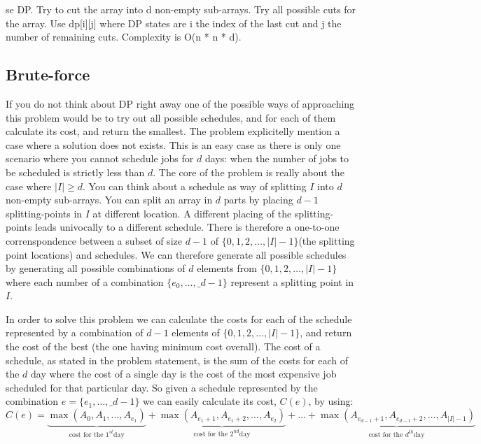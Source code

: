 se DP. Try to cut the array into d non-empty sub-arrays. Try all possible cuts for the array.
Use dp[i][j] where DP states are i the index of the last cut and j the number of remaining cuts. Complexity is O(n * n * d).

\subsection{Brute-force}
\label{min_difficulty_job_scheduler:sec:bruteforce}
If you do not think about DP right away one of the possible ways of approaching this problem would be to try out all possible schedules, and for each of them calculate its cost, 
and return the smallest. 
The problem explicitelly mention a case where a solution does not exists. This is an easy case as there is only one scenario
where you cannot schedule jobs for $d$ days: when the number of jobs to be scheduled is strictly less than $d$.
The core of the problem is really about the case where $|I| \geq d$. 
You can think about a schedule as way of splitting $I$ into $d$ non-empty sub-arrays.
You can split an array in $d$ parts by placing $d-1$ splitting-points in $I$ at different location.
A different placing of the splitting-points leads univocally to a different schedule. 
There is therefore a one-to-one correnspondence between a subset of size $d-1$ of $\{0,1,2, \ldots, |I|-1\}$(the splitting point locations) and schedules. 
We can therefore generate all possible schedules by generating all possible combinations of $d$ elements from $\{0,1,2, \ldots, |I|-1\}$
where each number of a combination  $\{e_0, \ldots, \_{d-1}\}$ represent a splitting point in $I$.

In order to solve this problem we can calculate the costs for each of the schedule represented by a combination of $d-1$ elements of $\{0,1,2, \ldots, |I|-1\}$, and return the cost of the best (the one having minimum cost overall).
The cost of a schedule, as stated in the problem statement, is the sum of the costs for each of the $d$ day where the cost of a single day is the cost of the most expensive job scheduled for that particular day. 
So given a schedule represented by the combination $e = \{e_1, \ldots, \_{d-1}\}$ we can easily calculate its cost, $C(e)$, by using:
\begin{equation*}
	C(e) = \underbrace{\max(A_0, A_1, \ldots, A_{e_1})}_{\text{cost for the } 1^{st} \text{day}} + \underbrace{\max(A_{e_1+1}, A_{e_1+2}, \ldots, A_{e_2})}_{\text{cost for the } 2^{nd} \text{day}} + \ldots + \underbrace{\max(A_{e_{d-1}+1}, A_{e_{d-1}+2}, \ldots, A_{|I|-1})}_{\text{cost for the } d^{th} \text{day}}
\end{equation*}

